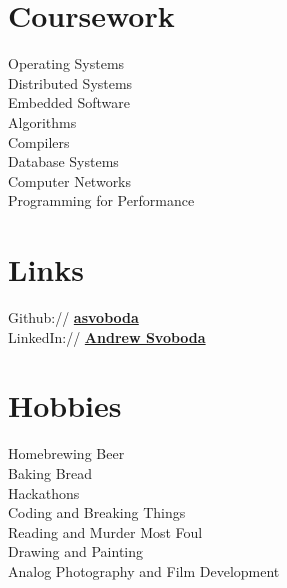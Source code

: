 \documentclass[]{deedy-resume}
\begin{document}
\begin{minipage}[t]{0.33\textwidth}
\section{Coursework}
Operating Systems \\
Distributed Systems \\
Embedded Software \\
Algorithms \\
Compilers \\
Database Systems \\
Computer Networks \\
Programming for Performance 
\sectionsep


\section{Links} 

Github:// \href{https://github.com/asvoboda}{\bf asvoboda} \\
LinkedIn:// \href{https://ca.linkedin.com/pub/andrew-svoboda/80/645/667}{\bf Andrew Svoboda}

\sectionsep


\section{Hobbies}

Homebrewing Beer \\
Baking Bread \\
Hackathons \\
Coding and Breaking Things \\
Reading and Murder Most Foul \\
Drawing and Painting \\
Analog Photography and Film Development

\sectionsep


%
%

\end{minipage} 
\end{document}

